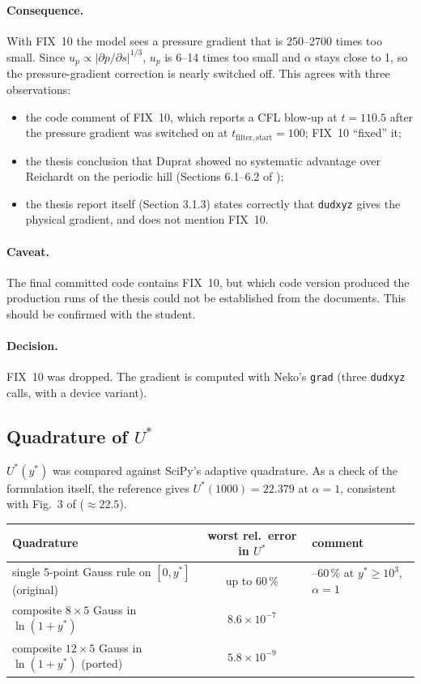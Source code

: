 \documentclass[11pt,a4paper]{article}
\newcommand{\code}[1]{\texttt{#1}}
\newcommand{\up}{u_p}
\newcommand{\dpds}{\partial p/\partial s}
\begin{document}
\paragraph{Consequence.} With FIX~10 the model sees a pressure gradient
that is 250--2700 times too small. Since $\up\propto|\dpds|^{1/3}$, $\up$
is 6--14 times too small and $\alpha$ stays close to 1, so the
pressure-gradient correction is nearly switched off. This agrees with three
observations:
\begin{itemize}
  \item the code comment of FIX~10, which reports a CFL blow-up at
    $t = 110.5$ after the pressure gradient was switched on at
    $t_{\mathrm{filter,start}} = 100$; FIX~10 ``fixed'' it;
  \item the thesis conclusion that Duprat showed no systematic advantage
    over Reichardt on the periodic hill (Sections 6.1--6.2 of
    \cite{bole2026});
  \item the thesis report itself (Section 3.1.3) states correctly that
    \code{dudxyz} gives the physical gradient, and does not mention FIX~10.
\end{itemize}

\paragraph{Caveat.} The final committed code contains FIX~10, but which code
version produced the production runs of the thesis could not be
established from the documents. This should be confirmed with the student.

\paragraph{Decision.} FIX~10 was dropped. The gradient is computed with
Neko's \code{grad} (three \code{dudxyz} calls, with a device variant).

\subsection{Quadrature of $U^*$}
\label{sec:quadrature}

$U^*(y^*)$ was compared against SciPy's adaptive quadrature. As a check of
the formulation itself, the reference gives $U^*(1000) = 22.379$ at
$\alpha=1$, consistent with Fig.~3 of \cite{duprat2011} ($\approx 22.5$).

\begin{center}
\small
\begin{tabularx}{\textwidth}{@{}>{\raggedright}Xc>{\raggedright\arraybackslash}X@{}}
\toprule
Quadrature & worst rel.\ error in $U^*$ & comment \\
\midrule
single 5-point Gauss rule on $[0,y^*]$ (original) & up to 60\,\% & 48--60\,\% at $y^* \ge 10^3$, $\alpha=1$ \\
composite $8\times5$ Gauss in $\ln(1+y^*)$ & $8.6\times10^{-7}$ & \\
composite $12\times5$ Gauss in $\ln(1+y^*)$ (ported) & $5.8\times10^{-9}$ & \\
\bottomrule
\end{tabularx}
\end{center}
\end{document}
